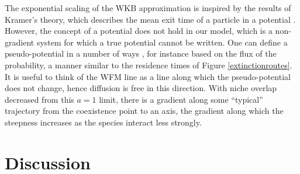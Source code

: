 \documentclass[a4paper,10pt]{article}
\numberwithin{equation}{section} %
\begin{document}
The exponential scaling of the WKB approximation is inspired by the results of Kramer's theory, which describes the mean exit time of a particle in a potential \cite{Berglund2011}. 
However, the concept of a potential does not hold in our model, which is a non-gradient system for which a true potential cannot be written. 
One can define a pseudo-potential in a number of ways \cite{Zhou2012}, for instance based on the flux of the probability, a manner similar to the residence times of Figure \ref{extinctionroutes}. 
It is useful to think of the WFM line as a line along which the pseudo-potential does not change, hence diffusion is free in this direction. With niche overlap decreased from this $a=1$ limit, there is a gradient along some ``typical'' trajectory from the coexistence point to an axis, the gradient along which the steepness increases as the species interact less strongly. 




\section{Discussion}%
\end{document}
